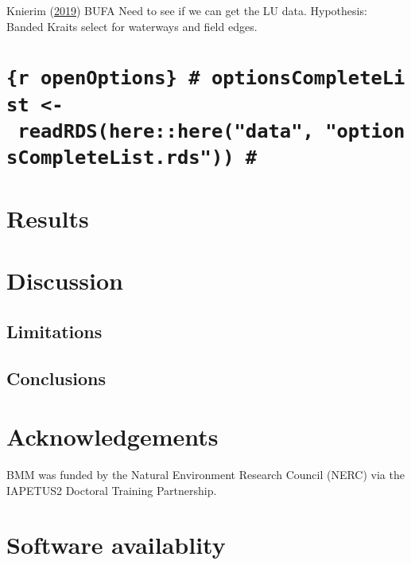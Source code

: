 \documentclass[10pt,a4paper]{article}
\begin{document}
Knierim (\protect\hyperlink{ref-knierim_spatial_2019}{2019})
BUFA
Need to see if we can get the LU data.
Hypothesis: Banded Kraits select for waterways and field edges.

\hypertarget{r-openoptions-optionscompletelist---readrdshereheredata-optionscompletelist.rds}{%
\section{\texorpdfstring{\texttt{\{r\ openOptions\}\ \#\ optionsCompleteList\ \textless{}-\ readRDS(here::here("data",\ "optionsCompleteList.rds"))\ \#}}{\{r openOptions\} \# optionsCompleteList \textless- readRDS(here::here("data", "optionsCompleteList.rds")) \#}}\label{r-openoptions-optionscompletelist---readrdshereheredata-optionscompletelist.rds}}

\hypertarget{results}{%
\section{Results}\label{results}}

\hypertarget{discussion}{%
\section{Discussion}\label{discussion}}

\hypertarget{limitations}{%
\subsection{Limitations}\label{limitations}}

\hypertarget{conclusions}{%
\subsection{Conclusions}\label{conclusions}}

\hypertarget{acknowledgements}{%
\section{Acknowledgements}\label{acknowledgements}}

BMM was funded by the Natural Environment Research Council (NERC) via the IAPETUS2 Doctoral Training Partnership.

\hypertarget{software-availablity}{%
\section{Software availablity}\label{software-availablity}}
\end{document}
